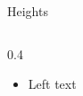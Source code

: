 \documentclass[aspectratio=169]{beamer}
\begin{document}
\begin{frame}{Heights}
\begin{columns}
\begin{column}{0.4\textwidth}
\begin{itemize}
\item Left text
\end{itemize}
\end{column}
\end{columns}
\end{frame}
\end{document}
